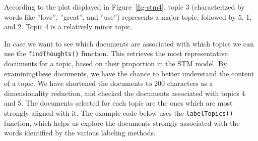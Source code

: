 According to the plot displayed in Figure~\ref{fig-stm4}, topic 3
(characterized by words like ''love'', ''great'', and ''use'') represents a major
topic, followed by 5, 1, and 2. Topic 4 is a relatively minor topic.

In case we want to see which documents are associated with which
topics we can use the \texttt{findThoughts()} function. This retrieves the
most representative documents for a topic, based on their
proportion in the STM model. By examiningthese documents, we have
the chance to better understand the content of a topic. We have
shortened the documents to 200 characters as a dimensionality reduction,
and checked the documents associated with topics 4 and 5. The documents
selected for each topic are the ones which are most strongly aligned with it. The example code below uses  the \texttt{labelTopics()}
function, which helps us explore the documents strongly associated
with the words identified by the various labeling methods.

\begin{Shaded}
\begin{Highlighting}[]
\OtherTok{\textless{}{-}} \SpecialCharTok{$}\NormalTok{, }\NormalTok{)}

\OtherTok{\textless{}{-}}  \NormalTok{,}
 \NormalTok{)}\SpecialCharTok{$}\NormalTok{docs[[}\NormalTok{]]}

\OtherTok{\textless{}{-}}  \NormalTok{,}
 \NormalTok{)}\SpecialCharTok{$}\NormalTok{docs[[}\NormalTok{]]}

\NormalTok{(} \NormalTok{(}\NormalTok{, }\NormalTok{), } \NormalTok{(}\NormalTok{, }\NormalTok{, }\NormalTok{, }\NormalTok{))}
 \NormalTok{, } \NormalTok{)}
 \NormalTok{, } \NormalTok{)}
\end{Highlighting}
\end{Shaded}

